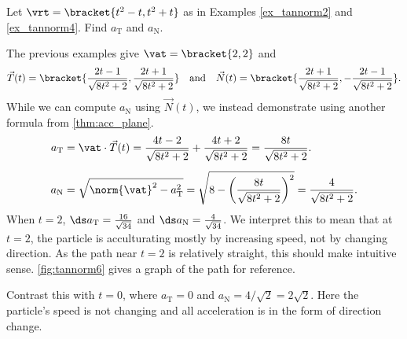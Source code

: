 {Let $\vrt=\bracket{t^2-t,t^2+t}$ as in Examples \ref{ex_tannorm2} and \ref{ex_tannorm4}. Find $a_\text{T}$ and $a_\text{N}$.}
{The previous examples give $\vat =\bracket{2,2}$ and
\[\vec T(t) =\bracket{\frac{2t-1}{\sqrt{8t^2+2}},\frac{2t+1}{\sqrt{8t^2+2}}}\quad \text{and}\quad \vec N(t) =\bracket{\frac{2t+1}{\sqrt{8t^2+2}},-\frac{2t-1}{\sqrt{8t^2+2}}}.\]
While we can compute $a_\text{N}$ using $\vec N(t)$, we instead demonstrate using another formula from \autoref{thm:acc_plane}.
\begin{align*}
a_\text{T} &= \vat\cdot\vec T(t) = \frac{4t-2}{\sqrt{8t^2+2}}+\frac{4t+2}{\sqrt{8t^2+2}} = \frac{8t}{\sqrt{8t^2+2}}.\\
a_\text{N} &= \sqrt{\norm{\vat}^2-a_\text{T}^2} = \sqrt{8-\left(\frac{8t}{\sqrt{8t^2+2}}\right)^2}=\frac{4}{\sqrt{8t^2+2}}\rule{0pt}{25pt}.
\end{align*}
When $t=2$, $\ds a_{\text{T}} = \frac{16}{\sqrt{34}}%
$ and $\ds a_{\text{N}} = \frac{4}{\sqrt{34}}%
$. We interpret this to mean that at $t=2$, the particle is acculturating mostly by increasing speed, not by changing direction. As the path near $t=2$ is relatively straight, this should make intuitive sense. \autoref{fig:tannorm6} gives a graph of the path for reference.

Contrast this with $t=0$, where $a_{\text{T}}=0$ and $a_{\text{N}}=4/\sqrt2=2\sqrt2 %
$. Here the particle's speed is not changing and all acceleration is in the form of direction change.}

